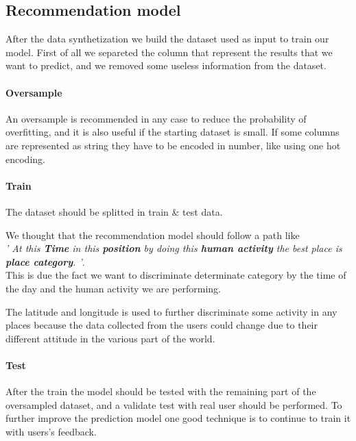 \documentclass[../../main]{subfiles}
\begin{document}
\label{ss:recommendation-model}
\subsection{Recommendation model}
After the data synthetization we build the dataset used as input to train our model. 
First of all we separeted the column that represent the results that we want to predict, and we removed some useless information from the dataset.
\paragraph*{Oversample}
An oversample is recommended in any case to reduce the probability of overfitting, and it is also useful if the starting dataset is small.
If some columns are represented as string they have to be encoded in number, like using one hot encoding.
\paragraph*{Train}
\label{paragraph:train_design}
The dataset should be splitted in train \& test data.

We thought that the recommendation model should follow a path like \\\textit{' At this \textbf{Time} in this \textbf{position} by doing this \textbf{human activity} the best place is \textbf{place category}. '}.
\\This is due the fact we want to discriminate determinate category by the time of the day and the human activity we are performing.

The latitude and longitude is used to further discriminate some activity in any places because the data collected from the users could change due to their different attitude in the various part of the world.
\paragraph*{Test}
After the train the model should be tested with the remaining part of the oversampled dataset, and a validate test with real user should be performed.
To further improve the prediction model one good technique is to continue to train it with users's feedback.
\end{document}
